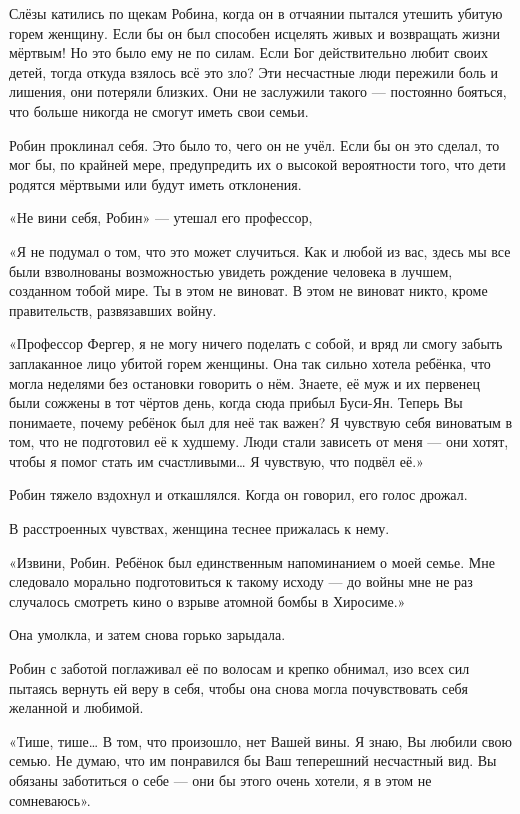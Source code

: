 \documentclass[a5paper, 9pt,
final, openany, twoside=true]{memoir}
\begin{document}
Слёзы катились по щекам Робина, когда он в отчаянии пытался утешить убитую горем женщину. Если бы он был способен исцелять живых и возвращать жизни мёртвым! Но это было ему не по силам. Если Бог действительно любит своих детей, тогда откуда взялось всё это зло? Эти несчастные люди пережили боль и лишения, они потеряли близких. Они не заслужили такого — постоянно бояться, что больше никогда не смогут иметь свои семьи.

Робин проклинал себя. Это было то, чего он не учёл. Если бы он это сделал, то мог бы, по крайней мере, предупредить их о высокой вероятности того, что дети родятся мёртвыми или будут иметь отклонения.

«Не вини себя, Робин» — утешал его профессор,

«Я не подумал о том, что это может случиться. Как и любой из вас, здесь мы все были взволнованы возможностью увидеть рождение человека в лучшем, созданном тобой мире. Ты в этом не виноват. В этом не виноват никто, кроме правительств, развязавших войну.

«Профессор Фергер, я не могу ничего поделать с собой, и вряд ли смогу забыть заплаканное лицо убитой горем женщины. Она так сильно хотела ребёнка, что могла неделями без остановки говорить о нём. Знаете, её муж и их первенец были сожжены в тот чёртов день, когда сюда прибыл Буси-Ян. Теперь Вы понимаете, почему ребёнок был для неё так важен? Я чувствую себя виноватым в том, что не подготовил её к худшему. Люди стали зависеть от меня — они хотят, чтобы я помог стать им счастливыми… Я чувствую, что подвёл её.»

Робин тяжело вздохнул и откашлялся. Когда он говорил, его голос дрожал.

В расстроенных чувствах, женщина теснее прижалась к нему.

«Извини, Робин. Ребёнок был единственным напоминанием о моей семье. Мне следовало морально подготовиться к такому исходу — до войны мне не раз случалось смотреть кино о взрыве атомной бомбы в Хиросиме.»

Она умолкла, и затем снова горько зарыдала.

Робин с заботой поглаживал её по волосам и крепко обнимал, изо всех сил пытаясь вернуть ей веру в себя, чтобы она снова могла почувствовать себя желанной и любимой.

«Тише, тише… В том, что произошло, нет Вашей вины. Я знаю, Вы любили свою семью. Не думаю, что им понравился бы Ваш теперешний несчастный вид. Вы обязаны заботиться о себе — они бы этого очень хотели, я в этом не сомневаюсь».
\end{document}
